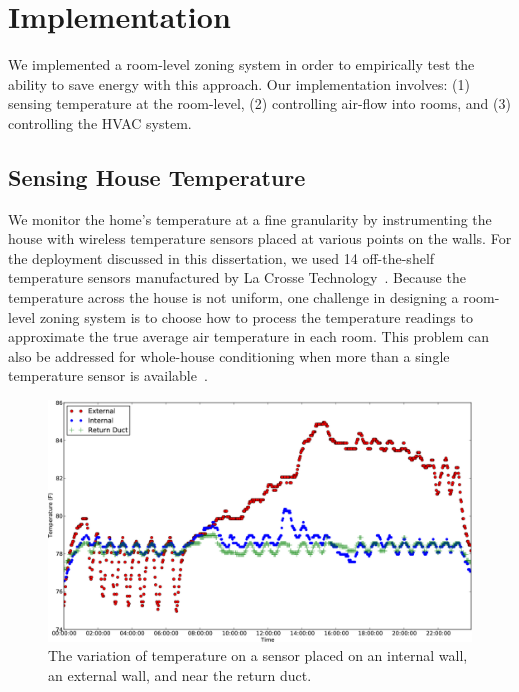 \chapter{Implementation}

We implemented a room-level zoning system in order to empirically test the
ability to save energy with this approach.  Our implementation involves: (1)
sensing temperature at the room-level, (2) controlling air-flow into rooms,
and (3) controlling the HVAC system.

\section{Sensing House Temperature}
\label{sec:sensingTemperature}

We monitor the home's temperature at a fine granularity by instrumenting the
house with wireless temperature sensors placed at various points on the
walls. For the deployment discussed in this dissertation, we used 14
off-the-shelf temperature sensors manufactured by La Crosse
Technology~\cite{LaCrosse}.  Because the temperature across the house is not
uniform, one challenge in designing a room-level zoning system is to choose how
to process the temperature readings to approximate the true average air
temperature in each room.  This problem can also be addressed for whole-house
conditioning when more than a single temperature sensor is
available~\cite{lin2002multi}.

\begin{figure}[t]
  \centering
  \includegraphics[width=0.6\columnwidth]{fig/intExtTherm.eps}
  \caption[Effect of Sensor Location on Temperature Reading]{The variation of
    temperature on a sensor placed on an internal wall, an external wall, and
    near the return duct.}
  \label{fig:intExtTherm}
\end{figure}

